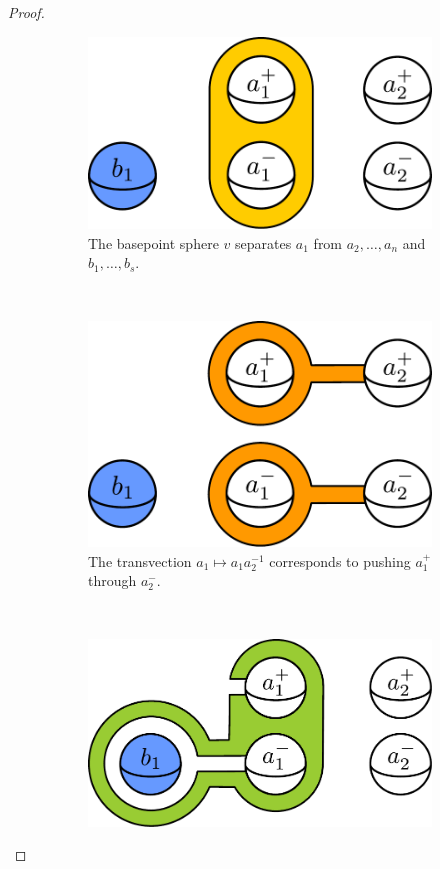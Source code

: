 \documentclass[11pt]{article}
\theoremstyle{remark}
\theoremstyle{definition}
\begin{document}
\begin{proof}
\begin{figure}[b!]
    \centering
    \begin{subfigure}[t]{0.3\textwidth}
        \includegraphics[width=\textwidth]{figures/sepconnect0.pdf}
        \caption{The basepoint sphere $v$ separates $a_1$
        from $a_2,\ldots, a_n$ and $b_1, \ldots, b_s$.}
        \label{fig:kput0}
    \end{subfigure}
    ~
    \begin{subfigure}[t]{0.3\textwidth}
        \includegraphics[width=\textwidth]{figures/sepconnect1.pdf}
        \caption{The transvection $a_1 \mapsto a_1a_2^{-1}$
        corresponds to
        pushing $a_1^+$ through $a_2^-$.}
        \label{fig:kput1}
    \end{subfigure}
    ~
    \begin{subfigure}[t]{0.3\textwidth}
        \includegraphics[width=\textwidth]{figures/sepconnect2.pdf}

\end{subfigure}
\end{figure}
\end{proof}
\end{document}
